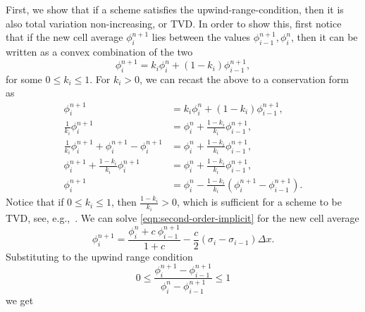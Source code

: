 \documentclass[../thesis.tex]{subfiles}
\begin{document}
First, we show that if a scheme satisfies the upwind-range-condition, then it is also total variation non-increasing, or TVD.
In order to show this, first notice that if the new cell average \(\phi_{i}^{n+1}\) lies
between the values \(\phi_{i-1}^{n+1}, \phi_{i}^{n}\), then it can be written as a convex combination of the two
\begin{equation}\label{eqn:convex-combination}
    \phi_{i}^{n+1} =
    k_{i}\phi_{i}^{n} + (1-k_{i})\phi_{i-1}^{n+1},
\end{equation}
for some \(0 \leq k_{i} \leq 1\).
For \(k_{i} > 0\), we can recast the above to a conservation form as
\begin{equation}\label{eqn:convex-combination-conservative}
    \begin{split}
        \phi_{i}^{n+1}
        &=
        k_{i}\phi_{i}^{n} + (1-k_{i})\phi_{i-1}^{n+1},
        \\
        \frac{1}{k_{i}}\phi_{i}^{n+1}
        &=
        \phi_{i}^{n} + \frac{1-k_{i}}{k_{i}}\phi_{i-1}^{n+1},
        \\
        \frac{1}{k_{i}}\phi_{i}^{n+1} + \phi_{i}^{n+1} - \phi_{i}^{n+1}
        &=
        \phi_{i}^{n} + \frac{1-k_{i}}{k_{i}}\phi_{i-1}^{n+1},
        \\
        \phi_{i}^{n+1} + \frac{1-k_{i}}{k_{i}}\phi_{i}^{n+1}
        &=
        \phi_{i}^{n} + \frac{1-k_{i}}{k_{i}}\phi_{i-1}^{n+1},
        \\
        \phi_{i}^{n+1}
        &=
        \phi_{i}^{n} - \frac{1-k_{i}}{k_{i}}\left( \phi_{i}^{n+1} - \phi_{i-1}^{n+1} \right).
    \end{split}
\end{equation}
Notice that if \(0 \leq k_{i} \leq 1\), then \( \frac{1-k_{i}}{k_{i}} > 0\), which is sufficient for a scheme to be TVD, see, e.g.,~\cite{2007_Duraisamy,2023_Frolkovic}.
We can solve \eqref{eqn:second-order-implicit} for the
new cell average
\begin{equation}\label{eqn: second order implicit - solution}
    \phi_{i}^{n+1} =
    \frac{\phi_{i}^{n} +
    c~\phi_{i-1}^{n+1}}{1+c}
    -\frac{c}{2}\left(
        \sigma_{i} - \sigma_{i-1}
        \right)\Delta x.
\end{equation}
Substituting to the upwind range condition
\[
    0
    \leq
    \frac{\phi_{i}^{n+1} - \phi_{i-1}^{n+1}}
    {\phi_{i}^{n} - \phi_{i-1}^{n+1}}
    \leq
    1
\]we get
\end{document}
